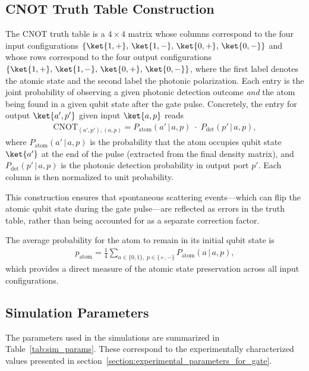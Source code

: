 \subsection{CNOT Truth Table Construction}\label{appendix:truth_table}

The CNOT truth table is a $4 \times 4$ matrix whose columns correspond to the four input configurations $\{\ket{1,+},\, \ket{1,-},\, \ket{0,+},\, \ket{0,-}\}$ and whose rows correspond to the four output configurations $\{\ket{1,+},\, \ket{1,-},\, \ket{0,+},\, \ket{0,-}\}$, where the first label denotes the atomic state and the second label the photonic polarization. Each entry is the joint probability of observing a given photonic detection outcome \emph{and} the atom being found in a given qubit state after the gate pulse. Concretely, the entry for output $\ket{a', p'}$ given input $\ket{a, p}$ reads
\begin{align}
	\text{CNOT}_{(a',p'),(a,p)} = P_{\text{atom}}(a' \,|\, a,p)\;\cdot\; P_{\text{det}}(p' \,|\, a,p), \label{eq:cnot_entry}
\end{align}
where $P_{\text{atom}}(a' \,|\, a,p)$ is the probability that the atom occupies qubit state $\ket{a'}$ at the end of the pulse (extracted from the final density matrix), and $P_{\text{det}}(p' \,|\, a,p)$ is the photonic detection probability in output port $p'$. Each column is then normalized to unit probability.

This construction ensures that spontaneous scattering events---which can flip the atomic qubit state during the gate pulse---are reflected as errors in the truth table, rather than being accounted for as a separate correction factor.

The average probability for the atom to remain in its initial qubit state is
\begin{align}
	p_{\text{atom}} = \frac{1}{4}\sum_{a \in \{0,1\},\; p \in \{+,-\}} P_{\text{atom}}(a \,|\, a,p),
\end{align}
which provides a direct measure of the atomic state preservation across all input configurations.

\subsection{Simulation Parameters}\label{appendix:sim_params}

The parameters used in the simulations are summarized in Table~\ref{tab:sim_params}. These correspond to the experimentally characterized values presented in section~\ref{section:experimental_parameters_for_gate}.


